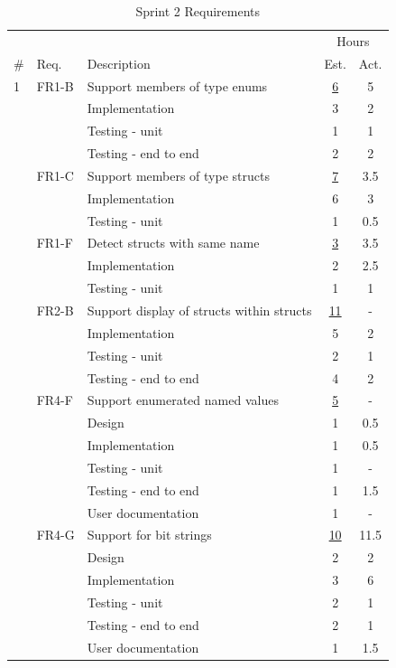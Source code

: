\begin{table}[!ht] \small \center
\caption{Sprint 2 Requirements\label{tab:sprint2req1}}
\begin{tabularx}{\textwidth}{l l X c c}
	\toprule
	& & & \multicolumn{2}{c}{Hours} \\
	\cmidrule(r){4-5}
	\# & Req. & Description & Est. & Act. \\
	\midrule
	1 & FR1-B & Support members of type enums & \underline{ 6 } & 5 \\
	   &  & Implementation			   	& 3 & 2\\
	   &  & Testing - unit				   	& 1 & 1\\
	   &  & Testing - end to end			& 2 & 2\\
	\addlinespace
	2 & FR1-C & Support members of type structs & \underline{ 7 } & 3.5  \\
	   &  & Implementation			   	& 6 & 3\\
	   &  & Testing - unit				   	& 1 & 0.5\\
	\addlinespace
	3 & FR1-F & Detect structs with same name & \underline{ 3 } &  3.5  \\
	   &  & Implementation			   	& 2 & 2.5\\
	   &  & Testing - unit				   	& 1 & 1\\
	\addlinespace
	4 & FR2-B & Support display of structs within structs & \underline{ 11 } &  -  \\
	   &  & Implementation			   	& 5 & 2\\
	   &  & Testing - unit				   	& 2 & 1\\
	   &  & Testing - end to end			& 4 & 2\\
	\addlinespace
	5 & FR4-F & Support enumerated named values  & \underline{ 5 } &  -  \\
	   &  & Design				   	& 1 & 0.5\\	   
	   &  & Implementation			   	& 1 & 0.5\\
	   &  & Testing - unit				   	& 1 & -\\
	   &  & Testing - end to end			& 1 & 1.5\\
	   &  & User documentation		   	& 1 & -\\
	\addlinespace
	6 & FR4-G & Support for bit strings & \underline{ 10 } & 11.5 \\
	   &  & Design				   	& 2 & 2\\	   
	   &  & Implementation			   	& 3 & 6\\
	   &  & Testing - unit				   	& 2 & 1\\
	   &  & Testing - end to end			& 2 & 1\\
	   &  & User documentation		   	& 1 & 1.5\\
	\bottomrule
\end{tabularx}
\end{table}


